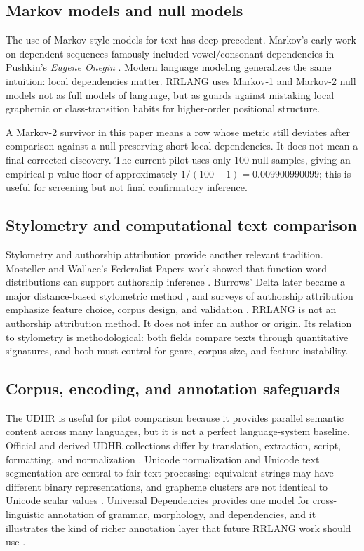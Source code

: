 \documentclass[11pt,a4paper]{article}
\newcommand{\RRLANG}{\textsc{RRLANG}}
\begin{document}
\subsection{Markov models and null models}
The use of Markov-style models for text has deep precedent. Markov's early work on dependent sequences famously included vowel/consonant dependencies in Pushkin's \emph{Eugene Onegin} \cite{markov1913}. Modern language modeling generalizes the same intuition: local dependencies matter. \RRLANG{} uses Markov-1 and Markov-2 null models not as full models of language, but as guards against mistaking local graphemic or class-transition habits for higher-order positional structure.

A Markov-2 survivor in this paper means a row whose metric still deviates after comparison against a null preserving short local dependencies. It does not mean a final corrected discovery. The current pilot uses only 100 null samples, giving an empirical p-value floor of approximately $1/(100+1)=0.009900990099$; this is useful for screening but not final confirmatory inference.

\subsection{Stylometry and computational text comparison}
Stylometry and authorship attribution provide another relevant tradition. Mosteller and Wallace's Federalist Papers work showed that function-word distributions can support authorship inference \cite{mostellerwallace}. Burrows' Delta later became a major distance-based stylometric method \cite{burrows2002}, and surveys of authorship attribution emphasize feature choice, corpus design, and validation \cite{stamatatos2009}. \RRLANG{} is not an authorship attribution method. It does not infer an author or origin. Its relation to stylometry is methodological: both fields compare texts through quantitative signatures, and both must control for genre, corpus size, and feature instability.

\subsection{Corpus, encoding, and annotation safeguards}
The UDHR is useful for pilot comparison because it provides parallel semantic content across many languages, but it is not a perfect language-system baseline. Official and derived UDHR collections differ by translation, extraction, script, formatting, and normalization \cite{udhrun,udhrcorpus}. Unicode normalization and Unicode text segmentation are central to fair text processing: equivalent strings may have different binary representations, and grapheme clusters are not identical to Unicode scalar values \cite{unicode15,unicode29}. Universal Dependencies provides one model for cross-linguistic annotation of grammar, morphology, and dependencies, and it illustrates the kind of richer annotation layer that future \RRLANG{} work should use \cite{ud}.
\end{document}
